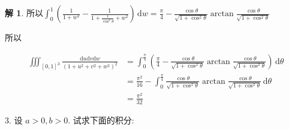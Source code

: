 \documentclass[a4paper,12pt]{article}
\theoremstyle{definition}
\newtheorem*{sol}{解}
\begin{document}
\begin{sol}
    所以$\int_0^1\left(\frac{1}{1+w^2}-\frac{1}{1+\frac{1}{\cos^2\theta}+w^2}\right)\,\mathrm{d}w=\frac{\pi}{4}-\frac{\cos\theta}{\sqrt{1+\cos^2\theta}}\arctan\frac{\cos\theta}{\sqrt{1+\cos^2\theta}}$

    所以

    \begin{align*}
        \iiint_{[0,1]^3} \frac{\mathrm{d}u\mathrm{d}v\mathrm{d}w}{(1 + u^2 + v^2 + w^2)^2}
         & =\int_0^{\frac{\pi}{4}}(\frac{\pi}{4}-\frac{\cos\theta}{\sqrt{1+\cos^2\theta}}\arctan\frac{\cos\theta}{\sqrt{1+\cos^2\theta}})\,\mathrm{d}\theta  \\
         & =\frac{\pi^2}{16}-\int_0^{\frac{\pi}{4}}\frac{\cos\theta}{\sqrt{1+\cos^2\theta}}\arctan\frac{\cos\theta}{\sqrt{1+\cos^2\theta}}\,\mathrm{d}\theta \\
         & =\frac{\pi^2}{32}
    \end{align*}
\end{sol}


3. 设 $a>0,b>0$. 试求下面的积分:
\end{document}
